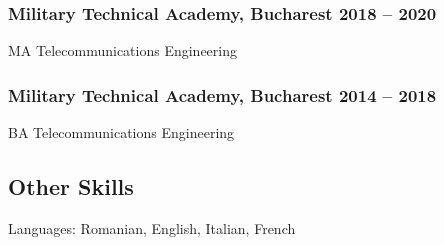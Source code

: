 \documentclass[a4paper,12pt]{article}
\begin{document}
\subsubsection*{\textbf{Military Technical Academy}, Bucharest \hfill 2018 -- 2020}
\label{sec:orgd1c138c}
MA Telecommunications Engineering
\subsubsection*{\textbf{Military Technical Academy}, Bucharest \hfill 2014 -- 2018}
\label{sec:org3f3c80e}
BA Telecommunications Engineering
\subsection*{\textbf{Other Skills}}
\label{sec:org652474a}
Languages: Romanian, English, Italian, French
\end{document}
